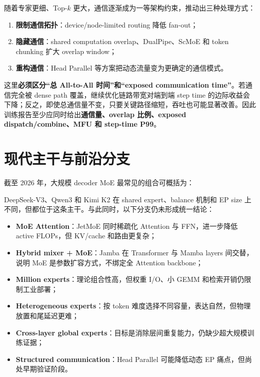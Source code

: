 \documentclass[10pt,a4paper,fontset=none]{ctexart}
\newcommand{\term}[1]{\textbf{#1}}
\begin{document}
随着专家更细、Top-$k$ 更大，通信逐渐成为一等架构约束，推动出三种处理方式：
\begin{enumerate}
  \item \term{限制通信拓扑}：device/node-limited routing 降低 fan-out；
  \item \term{隐藏通信}：shared computation overlap、DualPipe、ScMoE 和 token chunking 扩大 overlap window；
  \item \term{重构通信}：Head Parallel 等方案把动态流量变为更确定的通信模式。
\end{enumerate}

这里\term{必须区分“总 All-to-All 时间”和“exposed communication time”}。若通信完全被 dense path 覆盖，继续优化链路带宽对端到端 step time 的边际收益会下降；反之，即使总通信量不变，只要关键路径缩短，吞吐也可能显著改善。因此训练报告至少应同时给出\textbf{通信量、overlap 比例、exposed dispatch/combine、MFU 和 step-time P99}。

\section{现代主干与前沿分支}

截至 2026 年，大规模 decoder MoE 最常见的组合可概括为：
\begin{center}
\end{center}

DeepSeek-V3、Qwen3 和 Kimi K2 在 shared expert、balance 机制和 EP size 上不同，但都位于这条主干。与此同时，以下分支仍未形成统一结论：
\begin{itemize}
  \item \term{MoE Attention}：JetMoE 同时稀疏化 Attention 与 FFN，进一步降低 active FLOPs，但 KV/cache 和路由更复杂\cite{shen2024jetmoe}；
  \item \term{Hybrid mixer + MoE}：Jamba 在 Transformer 与 Mamba layers 间交替，说明 MoE 是参数扩容方式，不绑定全 Attention backbone\cite{lieber2024jamba}；
  \item \term{Million experts}：理论组合性高，但权重 I/O、小 GEMM 和检索开销仍限制工业部署；
  \item \term{Heterogeneous experts}：按 token 难度选择不同容量，表达自然，但物理放置和尾延迟更难；
  \item \term{Cross-layer global experts}：目标是消除层间重复能力，仍缺少超大规模训练证据；
  \item \term{Structured communication}：Head Parallel 可能降低动态 EP 痛点，但尚处早期验证阶段。
\end{itemize}
\end{document}
